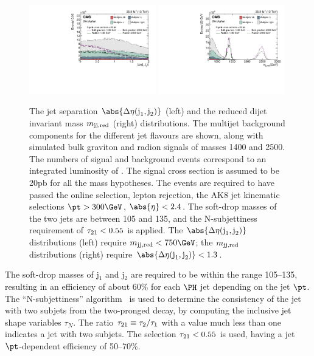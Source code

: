 \begin{figure}[htbp]
\centering
\includegraphics[width=0.49\textwidth]{B2G-16-026/Figure_002-a.pdf}
\includegraphics[width=0.49\textwidth]{B2G-16-026/Figure_002-b.pdf}
\caption{The jet separation $\abs{\DeltaEta}$ (left) and the reduced dijet
  invariant mass $m_{\text{jj,red}}$ (right) distributions. The multijet background components
  for the different jet flavours are shown, along with simulated bulk
  graviton and radion signals of masses 1400 and 2500\GeV. The numbers of signal
  and background events correspond to an integrated luminosity of \intLumi. The signal cross section is assumed to be 20\unit{pb}
  for all the mass hypotheses. The events are required to have passed
  the online selection, lepton rejection, the AK8 jet kinematic
  selections $\pt > 300\GeV$, $\abs{\eta} < 2.4$. The soft-drop masses of
  the two jets are between 105 and 135\GeV, and the N-subjettiness
  requirement of $\tau_{21} < 0.55$ is applied. The $\abs{\DeltaEta}$
  distributions (left) require $\mjjs < 750\GeV$;
  the $m_{\text{jj,red}}$ distributions (right) require $\abs{\DeltaEta} < 1.3$.}
\label{fig:deta_mjjred_prebtag}
\end{figure}

The soft-drop masses of j$_{1}$ and j$_{2}$ are required
to be within the range 105--135\GeV, resulting in an efficiency of about 60\%
for each $\PH$ jet depending on the jet $\pt$.
The ``N-subjettiness'' algorithm~\cite{Thaler:2011gf} is used to
determine the consistency of the jet with two subjets from the two-pronged \Hbb decay, by computing the inclusive jet shape variables $\tau_{N}$. The ratio $\tau_{21} \equiv \tau_2/\tau_1$ with a value much less than one indicates a jet with two subjets. The selection $\tau_{21} < 0.55$ is used, having a jet $\pt$-dependent efficiency of 50--70\%.

